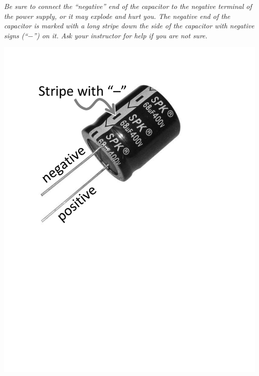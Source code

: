 \begin{minipage}{0.82\textwidth}
\begin{newboxed}
\textit{Be sure to connect the “negative” end of the capacitor to the negative terminal of the power supply, or it may explode and hurt you.  The negative end of the capacitor is marked with a long stripe down the side of the capacitor with negative signs (``$-$'') on it.  Ask your instructor for help if you are not sure.}
\end{newboxed}
\end{minipage}
\begin{minipage}{0.17\textwidth}
\includegraphics[width=1.0\textwidth]{rc_circuits/capacitor2_bw.pdf}
\end{minipage}

